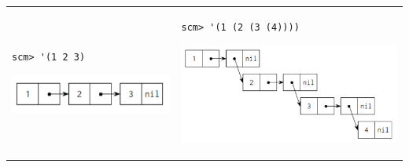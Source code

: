 \documentclass{exam}
\begin{document}
\begin{questions}
\begin{tabular}{m{7cm} m{6cm}}
\begin{lstlisting}
scm> '(1 2 3)
\end{lstlisting}
\begin{solution}
\begin{center}
 \includegraphics[scale=0.7]{bp1}
\end{center}
\end{solution}
&
\begin{lstlisting}
scm> '(1 (2 (3 (4))))
\end{lstlisting}
\begin{solution}
\begin{center}
 \includegraphics[scale=0.7]{bp2}
\end{center}
\end{solution}
\end{tabular}
\end{questions}
\end{document}
